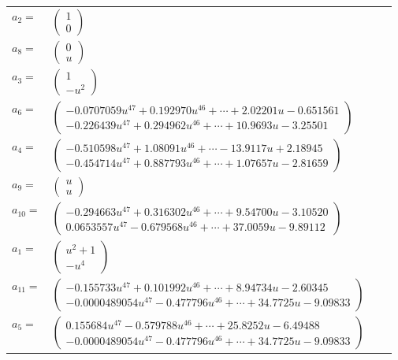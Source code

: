 \documentclass[1p]{elsarticle_modified}
\theoremstyle{definition}
\begin{document}
\begin{tabular}{m{7pt} m{180pt} m{7pt} m{180pt} }
\flushright $a_{2}=$&$\begin{pmatrix}1\\0\end{pmatrix}$ \\
\flushright $a_{8}=$&$\begin{pmatrix}0\\u\end{pmatrix}$ \\
\flushright $a_{3}=$&$\begin{pmatrix}1\\- u^2\end{pmatrix}$ \\
\flushright $a_{6}=$&$\begin{pmatrix}-0.0707059 u^{47}+0.192970 u^{46}+\cdots+2.02201 u-0.651561\\-0.226439 u^{47}+0.294962 u^{46}+\cdots+10.9693 u-3.25501\end{pmatrix}$ \\
\flushright $a_{4}=$&$\begin{pmatrix}-0.510598 u^{47}+1.08091 u^{46}+\cdots-13.9117 u+2.18945\\-0.454714 u^{47}+0.887793 u^{46}+\cdots+1.07657 u-2.81659\end{pmatrix}$ \\
\flushright $a_{9}=$&$\begin{pmatrix}u\\u\end{pmatrix}$ \\
\flushright $a_{10}=$&$\begin{pmatrix}-0.294663 u^{47}+0.316302 u^{46}+\cdots+9.54700 u-3.10520\\0.0653557 u^{47}-0.679568 u^{46}+\cdots+37.0059 u-9.89112\end{pmatrix}$ \\
\flushright $a_{1}=$&$\begin{pmatrix}u^2+1\\- u^4\end{pmatrix}$ \\
\flushright $a_{11}=$&$\begin{pmatrix}-0.155733 u^{47}+0.101992 u^{46}+\cdots+8.94734 u-2.60345\\-0.0000489054 u^{47}-0.477796 u^{46}+\cdots+34.7725 u-9.09833\end{pmatrix}$ \\
\flushright $a_{5}=$&$\begin{pmatrix}0.155684 u^{47}-0.579788 u^{46}+\cdots+25.8252 u-6.49488\\-0.0000489054 u^{47}-0.477796 u^{46}+\cdots+34.7725 u-9.09833\end{pmatrix}$ \\

\end{tabular}
\end{document}
